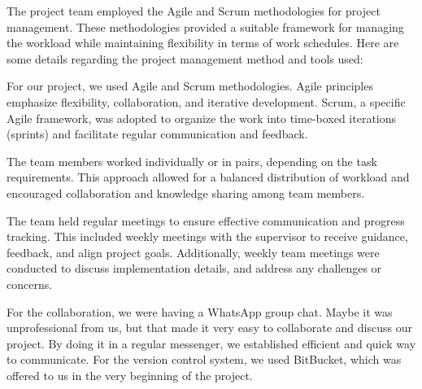 The project team employed the Agile and Scrum methodologies for project management. These methodologies provided a suitable framework for managing the workload while maintaining flexibility in terms of work schedules. Here are some details regarding the project management method and tools used:

\vspace{\baselineskip}

For our project, we used Agile and Scrum methodologies. Agile principles emphasize flexibility, collaboration, and iterative development. Scrum, a specific Agile framework, was adopted to organize the work into time-boxed iterations (sprints) and facilitate regular communication and feedback.

\vspace{\baselineskip}

The team members worked individually or in pairs, depending on the task requirements. This approach allowed for a balanced distribution of workload and encouraged collaboration and knowledge sharing among team members.


\vspace{\baselineskip}

The team held regular meetings to ensure effective communication and progress tracking. This included weekly meetings with the supervisor to receive guidance, feedback, and align project goals. Additionally, weekly team meetings were conducted to discuss implementation details, and address any challenges or concerns.

\vspace{\baselineskip}

For the collaboration, we were having a WhatsApp group chat. Maybe it was unprofessional from us, but that made it very easy to collaborate and discuss our project. By doing it in a regular messenger, we established efficient and quick way to communicate. For the version control system, we used BitBucket, which was offered to us in the very beginning of the project.